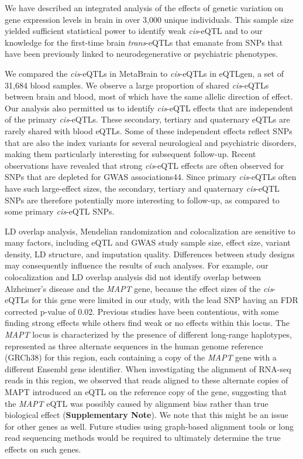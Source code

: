 We have described an integrated analysis of the effects of genetic variation on gene expression levels in brain in over 3,000 unique individuals. This sample size yielded sufficient statistical power to identify weak \emph{cis}-eQTL and to our knowledge for the first-time brain \emph{trans}-eQTLs that emanate from SNPs that have been previously linked to neurodegenerative or psychiatric phenotypes. 

We compared the \emph{cis}-eQTLs in MetaBrain to \emph{cis}-eQTLs in eQTLgen, a set of 31,684 blood samples. We observe a large proportion of shared \emph{cis}-eQTLs between brain and blood, most of which have the same allelic direction of effect. Our analysis also permitted us to identify \emph{cis}-eQTL effects that are independent of the primary \emph{cis}-eQTLs. These secondary, tertiary and quaternary eQTLs are rarely shared with blood eQTLs. Some of these independent effects reflect SNPs that are also the index variants for several neurological and psychiatric disorders, making them particularly interesting for subsequent follow-up. Recent observations have revealed that strong \emph{cis}-eQTL effects are often observed for SNPs that are depleted for GWAS associations44. Since primary \emph{cis}-eQTLs often have such large-effect sizes, the secondary, tertiary and quaternary \emph{cis}-eQTL SNPs are therefore potentially more interesting to follow-up, as compared to some primary \emph{cis}-eQTL SNPs. 

LD overlap analysis, Mendelian randomization and colocalization are sensitive to many factors, including eQTL and GWAS study sample size, effect size, variant density, LD structure, and imputation quality. Differences between study designs may consequently influence the results of such analyses. For example, our colocalization and LD overlap analysis did not identify overlap between Alzheimer’s disease and the \emph{MAPT} gene, because the effect sizes of the \emph{cis}-eQTLs for this gene were limited in our study, with the lead SNP having an FDR corrected p-value of 0.02. Previous studies have been contentious, with some finding strong effects\cite{wangComprehensiveFunctionalGenomic2018,ngXQTLMapIntegrates2017} while others find weak or no effects within this locus\cite{gtexconsortiumGeneticEffectsGene2017,siebertsLargeEQTLMetaanalysis2020}. The \emph{MAPT} locus is characterized by the presence of different long-range haplotypes, represented as three alternate sequences in the human genome reference (GRCh38) for this region, each containing a copy of the \emph{MAPT} gene with a different Ensembl gene identifier. When investigating the alignment of RNA-seq reads in this region, we observed that reads aligned to these alternate copies of MAPT introduced an eQTL on the reference copy of the gene, suggesting that the \emph{MAPT} eQTL was possibly caused by alignment bias rather than true biological effect (\textbf{Supplementary Note}). We note that this might be an issue for other genes as well. Future studies using graph-based alignment tools or long read sequencing methods would be required to ultimately determine the true effects on such genes. 


